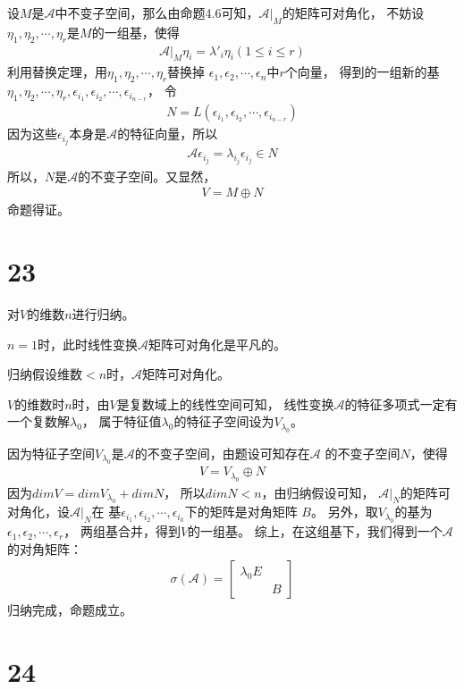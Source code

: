 \documentclass{article}
\begin{document}
设$M$是$\mathscr{A}$中不变子空间，那么由命题4.6可知，$\mathscr{A}|_M$的矩阵可对角化，
不妨设$\eta_1, \eta_2, \cdots, \eta_r$是$M$的一组基，使得
\begin{align*}
  \mathscr{A}|_M \eta_i = \lambda'_i \eta_i (1 \leq i \leq r)
\end{align*}
利用替换定理，用$\eta_1, \eta_2, \cdots, \eta_r$替换掉
$\epsilon_1, \epsilon_2, \cdots, \epsilon_n$中$r$个向量，
得到的一组新的基$\eta_1, \eta_2, \cdots, \eta_r, \epsilon_{i_1}, \epsilon_{i_2}, \cdots, \epsilon_{i_{n - r}}$，
令
\begin{align*}
  N = L(\epsilon_{i_1}, \epsilon_{i_2}, \cdots, \epsilon_{i_{n - r}})
\end{align*}
因为这些$\epsilon_{i_j}$本身是$\mathscr{A}$的特征向量，所以
\begin{align*}
  \mathscr{A} \epsilon_{i_j} = \lambda_{i_j} \epsilon_{i_j} \in N
\end{align*}
所以，$N$是$\mathscr{A}$的不变子空间。又显然，
\begin{align*}
  V = M \oplus N
\end{align*}
命题得证。

\section*{23}

对$V$的维数$n$进行归纳。

$n = 1$时，此时线性变换$\mathscr{A}$矩阵可对角化是平凡的。

归纳假设维数$< n$时，$\mathscr{A}$矩阵可对角化。

$V$的维数时$n$时，由$V$是复数域上的线性空间可知，
线性变换$\mathscr{A}$的特征多项式一定有一个复数解$\lambda_0$，
属于特征值$\lambda_0$的特征子空间设为$V_{\lambda_0}$。

因为特征子空间$V_{\lambda_0}$是$\mathscr{A}$的不变子空间，由题设可知存在$\mathscr{A}$
的不变子空间$N$，使得
\begin{align*}
  V = V_{\lambda_0} \oplus N
\end{align*}
因为$dim V = dim V_{\lambda_0} + dim N$，
所以$dim N < n$，由归纳假设可知，
$\mathscr{A}|_N$的矩阵可对角化，设$\mathscr{A}|_N$在
基$\epsilon_{i_1}, \epsilon_{i_2}, \cdots, \epsilon_{i_k}$下的矩阵是对角矩阵
$B$。
另外，取$V_{\lambda_0}$的基为$\epsilon_1, \epsilon_2, \cdots, \epsilon_r$，
两组基合并，得到$V$的一组基。
综上，在这组基下，我们得到一个$\mathscr{A}$的对角矩阵：
\begin{align*}
  \sigma(\mathscr{A}) = \begin{bmatrix}
                          \lambda_0 E &   \\
                                      & B
                        \end{bmatrix}
\end{align*}
归纳完成，命题成立。

\section*{24}
\end{document}
